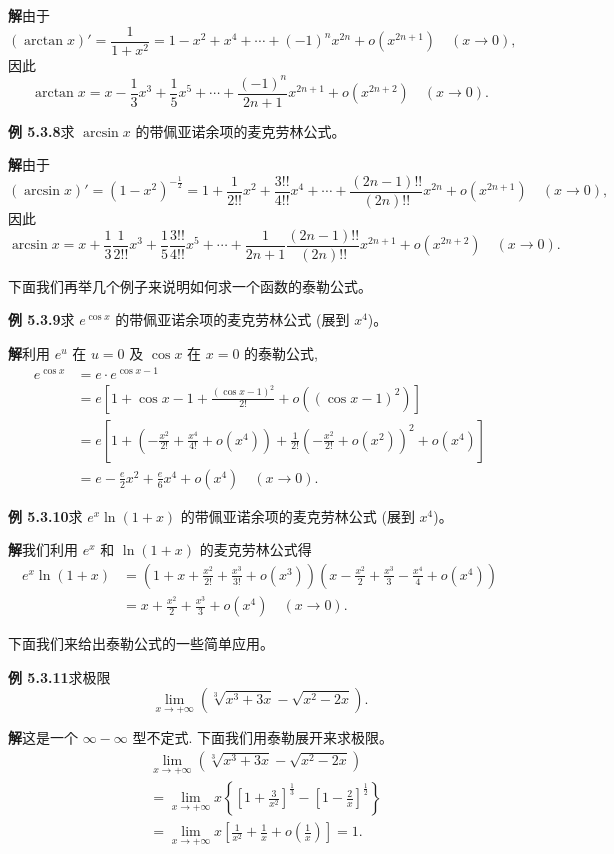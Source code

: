 \documentclass[UTF8,12pt,a4paper,fontset=fandol]{ctexart}
\begin{document}
\noindent\textbf{解}\quad 由于
\[
  (\arctan x)'=\frac1{1+x^2}=1-x^2+x^4+\cdots+(-1)^nx^{2n}+o(x^{2n+1})\quad (x\to0),
\]
因此
\[
  \arctan x=x-\frac13x^3+\frac15x^5+\cdots+\frac{(-1)^n}{2n+1}x^{2n+1}+o(x^{2n+2})\quad (x\to0).
\]

\noindent\textbf{例 5.3.8}\quad 求 $\arcsin x$ 的带佩亚诺余项的麦克劳林公式。

\noindent\textbf{解}\quad 由于
\[
  (\arcsin x)'=(1-x^2)^{-\frac12}
  =
  1+\frac1{2!!}x^2+\frac{3!!}{4!!}x^4+\cdots+
  \frac{(2n-1)!!}{(2n)!!}x^{2n}+o(x^{2n+1})
  \quad (x\to0),
\]
因此
\[
  \arcsin x
  =
  x+\frac13\frac1{2!!}x^3+\frac15\frac{3!!}{4!!}x^5+\cdots
  +\frac1{2n+1}\frac{(2n-1)!!}{(2n)!!}x^{2n+1}
  +o(x^{2n+2})
  \quad (x\to0).
\]

下面我们再举几个例子来说明如何求一个函数的泰勒公式。

\noindent\textbf{例 5.3.9}\quad 求 $e^{\cos x}$ 的带佩亚诺余项的麦克劳林公式 (展到 $x^4$)。

\noindent\textbf{解}\quad 利用 $e^u$ 在 $u=0$ 及 $\cos x$ 在 $x=0$ 的泰勒公式,
\[
\begin{aligned}
  e^{\cos x}
  &=
  e\cdot e^{\cos x-1} \\
  &=
  e\left[1+\cos x-1+\frac{(\cos x-1)^2}{2!}+o((\cos x-1)^2)\right] \\
  &=
  e\left[1+\left(-\frac{x^2}{2!}+\frac{x^4}{4!}+o(x^4)\right)
  +\frac1{2!}\left(-\frac{x^2}{2!}+o(x^2)\right)^2+o(x^4)\right] \\
  &=
  e-\frac e2x^2+\frac e6x^4+o(x^4)\quad (x\to0).
\end{aligned}
\]

\noindent\textbf{例 5.3.10}\quad 求 $e^x\ln(1+x)$ 的带佩亚诺余项的麦克劳林公式 (展到 $x^4$)。

\noindent\textbf{解}\quad 我们利用 $e^x$ 和 $\ln(1+x)$ 的麦克劳林公式得
\[
\begin{aligned}
  e^x\ln(1+x)
  &=
  \left(1+x+\frac{x^2}{2!}+\frac{x^3}{3!}+o(x^3)\right)
  \left(x-\frac{x^2}{2}+\frac{x^3}{3}-\frac{x^4}{4}+o(x^4)\right) \\
  &=
  x+\frac{x^2}{2}+\frac{x^3}{3}+o(x^4)\quad (x\to0).
\end{aligned}
\]

下面我们来给出泰勒公式的一些简单应用。

\noindent\textbf{例 5.3.11}\quad 求极限
\[
  \lim_{x\to+\infty}\left(\sqrt[3]{x^3+3x}-\sqrt{x^2-2x}\right).
\]

\noindent\textbf{解}\quad 这是一个 $\infty-\infty$ 型不定式. 下面我们用泰勒展开来求极限。
\[
\begin{aligned}
  &\lim_{x\to+\infty}\left(\sqrt[3]{x^3+3x}-\sqrt{x^2-2x}\right) \\
  &=
  \lim_{x\to+\infty}x
  \left\{
    \left[1+\frac3{x^2}\right]^{\frac13}
    -
    \left[1-\frac2x\right]^{\frac12}
  \right\} \\
  &=
  \lim_{x\to+\infty}x
  \left[
    \frac1{x^2}+\frac1x+o\left(\frac1x\right)
  \right]
  =
  1.
\end{aligned}
\]
\end{document}
